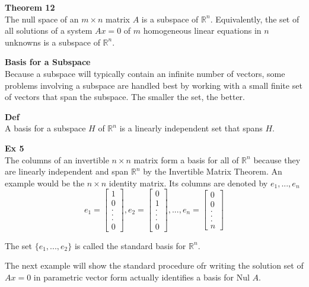 \documentclass{article}
\begin{document}
  \textbf{Theorem 12}\\
  The null space of an $ m \times n $ matrix $ A $ is a subspace of $ \mathbb{R}^{n} $. Equivalently, the set of all solutions of a system $ Ax=0 $ of $ m $ homogeneous linear equations in $ n $ unknowns is a subspace of $ \mathbb{R}^{n}  $.

  \textbf{Basis for a Subspace}\\
  Because a subspace will typically contain an infinite number of vectors, some problems involving a subspace are handled best by working with a small finite set of vectors that span the subspace. The smaller the set, the better.

  \textbf{Def}\\
  A basis for a subspace $ H $ of $ \mathbb{R}^{n} $ is a linearly independent set that spans $ H $.

  \textbf{Ex 5}\\
  The columns of an invertible $ n \times n $ matrix form a basis for all of $ \mathbb{R}^{n} $ because they are linearly independent and span $ \mathbb{R}^{n} $ by the Invertible Matrix Theorem. An example would be the $ n \times n $ identity matrix. Its columns are denoted by $ e_1,...,e_n $
  \[
    e_1 = \begin{bmatrix}
      1\\
      0\\
      .\\
      .\\
      .\\
      0
    \end{bmatrix},
    e_2 = \begin{bmatrix}
      0\\
      1\\
      .\\
      .\\
      .\\
      0
    \end{bmatrix}, ...,
    e_n = \begin{bmatrix}
      0\\
      0\\
      .\\
      .\\
      .\\
      n
    \end{bmatrix}
  \]

  The set $ \{ e_1,...,e_2 \} $ is called the standard basis for $ \mathbb{R}^{n} $.

  The next example will show the standard procedure ofr writing the solution set of $ Ax=0 $ in parametric vector form actually identifies a basis for Nul $ A $.
\end{document}
